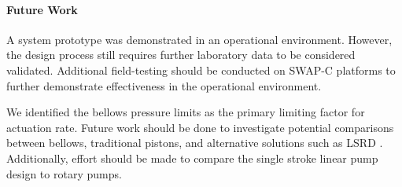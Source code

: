 \hypertarget{ch1:future-work}{%
\paragraph{Future Work}\label{ch1:future-work}}

A system prototype was demonstrated in an operational environment.
However, the design process still requires further laboratory data to be
considered validated. Additional field-testing should be conducted on
SWAP-C platforms to further demonstrate effectiveness in the operational
environment.

We identified the bellows pressure limits as the primary limiting factor
for actuation rate. Future work should be done to investigate potential
comparisons between bellows, traditional pistons, and alternative
solutions such as \gls{LSRD} \cite{gruebele2019long}. Additionally, effort should be made to compare the single stroke linear pump design to rotary pumps.